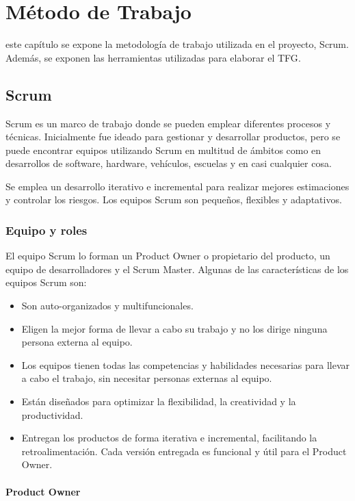 \chapter{Método de Trabajo}
\label{chap:metodo}

 este capítulo se expone la metodología de trabajo utilizada en el proyecto, Scrum. Además,
se exponen las herramientas utilizadas para elaborar el \acs{TFG}.

\section{Scrum}

Scrum es un marco de trabajo donde se pueden emplear diferentes procesos y técnicas. Inicialmente 
fue ideado para gestionar y desarrollar productos, pero se puede encontrar equipos utilizando Scrum 
en multitud de ámbitos como en desarrollos de software, hardware, vehículos, escuelas y en casi cualquier 
cosa.

Se emplea un desarrollo iterativo e incremental para realizar mejores estimaciones y controlar 
los riesgos. Los equipos Scrum son pequeños, flexibles y adaptativos. 

\subsection{Equipo y roles}

El equipo Scrum lo forman un Product Owner o propietario del producto, un equipo de desarrolladores y el Scrum Master. Algunas
de las características de los equipos Scrum son:

\begin{itemize}
	\item Son auto-organizados y multifuncionales.
	\item Eligen la mejor forma de llevar a cabo su trabajo y no los dirige ninguna persona externa al equipo.
	\item Los equipos tienen todas las competencias y habilidades necesarias para llevar a cabo el trabajo,
	sin necesitar personas externas al equipo.
	\item Están diseñados para optimizar la flexibilidad, la creatividad y la productividad.
	\item Entregan los productos de forma iterativa e incremental, facilitando la retroalimentación. Cada versión entregada
	es funcional y útil para el Product Owner.
\end{itemize}

\subsubsection{Product Owner}

